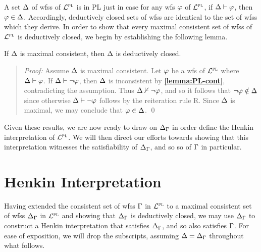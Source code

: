 A set $\Delta$ of wfss of $\mathcal{L}^{\textsc{pl}}$ is  in PL just in case for any wfs $\varphi$ of $\mathcal{L}^{\textsc{pl}}$, if $\Delta\vdash\varphi$, then $\varphi\in\Delta$.
Accordingly, deductively closed sets of wfss are identical to the set of wfss which they derive.
In order to show that every maximal consistent set of wfss of $\mathcal{L}^{\textsc{pl}}$ is deductively closed, we begin by establishing the following lemma.

\begin{Lthm} \label{lemma:PL-deductive}
  If $\Delta$ is maximal consistent, then $\Delta$ is deductively closed.
\end{Lthm} \vspace{-.2in}

\begin{quote} 
  \textit{Proof:} Assume $\Delta$ is maximal consistent.
  Let $\varphi$ be a wfs of $\mathcal{L}^{\textsc{pl}}$ where $\Delta\vdash\varphi$.
  If $\Delta\vdash\neg\varphi$, then $\Delta$ is inconsistent by \textbf{\ref{lemma:PL-cont}}, contradicting the assumption.
  Thus $\Delta\nvdash\neg\varphi$, and so it follows that $\neg\varphi\notin\Delta$ since otherwise $\Delta\vdash\neg\varphi$ follows by the reiteration rule R. 
  Since $\Delta$ is maximal, we may conclude that $\varphi\in\Delta$. 
  \qed
\end{quote}

Given these results, we are now ready to draw on  $\Delta_{\Gamma}$ in order define the Henkin interpretation of $\mathcal{L}^{\textsc{pl}}$.
We will then direct our efforts towards showing that this interpretation witnesses the satisfiability of $\Delta_{\Gamma}$, and so so of $\Gamma$ in particular. 



\section{Henkin Interpretation}%
  \label{sub:HenkinInterpretation}

Having extended the consistent set of wfss $\Gamma$ in $\mathcal{L}^{\textsc{pl}}$ to a maximal consistent set of wfss $\Delta_{\Gamma}$ in $\mathcal{L}^{\textsc{pl}}$ and showing that $\Delta_{\Gamma}$ is deductively closed, we may use $\Delta_{\Gamma}$ to construct a Henkin interpretation that satisfies $\Delta_{\Gamma}$, and so also satisfies $\Gamma$.
For ease of exposition, we will drop the subscripts, assuming $\Delta=\Delta_{\Gamma}$ throughout what follows.

